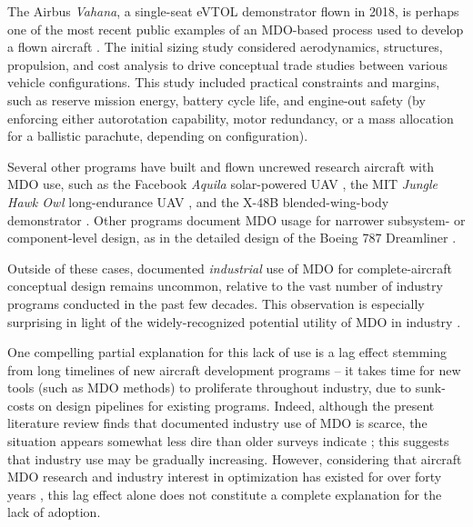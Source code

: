 The Airbus \textit{Vahana}, a single-seat eVTOL demonstrator flown in 2018, is perhaps one of the most recent public examples of an MDO-based process used to develop a flown aircraft \cite{vahana_1, vahana_2, vahana_code}. The initial sizing study considered aerodynamics, structures, propulsion, and cost analysis to drive conceptual trade studies between various vehicle configurations. This study included practical constraints and margins, such as reserve mission energy, battery cycle life, and engine-out safety (by enforcing either autorotation capability, motor redundancy, or a mass allocation for a ballistic parachute, depending on configuration).

Several other programs have built and flown uncrewed research aircraft with MDO use, such as the Facebook \textit{Aquila} solar-powered UAV \cite{fbhale}, the MIT \textit{Jungle Hawk Owl} long-endurance UAV \cite{jho}, and the X-48B blended-wing-body demonstrator \cite{wakayama_2000_blended, liebeck_blendedwingbody_1998, liebeck2004design}. Other programs document MDO usage for narrower subsystem- or component-level design, as in the detailed design of the Boeing 787 Dreamliner \cite{agte_mdo_2010}.

Outside of these cases, documented \textit{industrial} use of MDO for complete-aircraft conceptual design remains uncommon, relative to the vast number of industry programs conducted in the past few decades. This observation is especially surprising in light of the widely-recognized potential utility of MDO in industry \cite{mcmasters_airplane_2002, torenbeek_advanced_2013}.

One compelling partial explanation for this lack of use is a lag effect stemming from long timelines of new aircraft development programs -- it takes time for new tools (such as MDO methods) to proliferate throughout industry, due to sunk-costs on design pipelines for existing programs. Indeed, although the present literature review finds that documented industry use of MDO is scarce, the situation appears somewhat less dire than older surveys indicate \cite{kroo_multidisciplinary_1997, agte_mdo_2010, ashley_making_1982, haftka_multidisciplinary_1997, gazaix_industrialization_2017}; this suggests that industry use may be gradually increasing. However, considering that aircraft MDO research and industry interest in optimization has existed for over forty years \cite{vanderplaats_automated_1976, ashley_making_1982}, this lag effect alone does not constitute a complete explanation for the lack of adoption.

